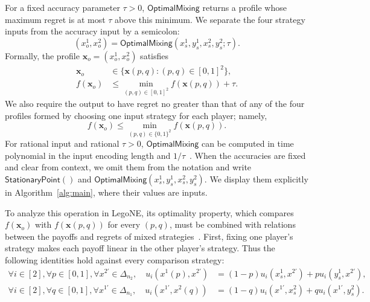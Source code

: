 \documentclass[11pt]{article}
\theoremstyle{remark}
\theoremstyle{plain}
\newcommand{\om}{\mathsf{OptimalMixing}}
\newcommand{\spoint}{\mathsf{StationaryPoint}}
\begin{document}
For a fixed accuracy parameter $\tau>0$, $\om$ returns a profile whose
maximum regret is at most $\tau$ above this minimum. We separate the
four strategy inputs from the accuracy input by a semicolon:
\[
 (x_o^1,x_o^2)=\om(x_s^1,y_s^1,x_s^2,y_s^2;\tau).
\]
Formally, the profile $\boldsymbol{x}_o=(x_o^1,x_o^2)$ satisfies
\begin{equation}
 \begin{aligned}
  \boldsymbol{x}_o&\in
      \{\boldsymbol{x}(p,q):(p,q)\in[0,1]^2\},\\
  f(\boldsymbol{x}_o)&\le
       \min_{(p,q)\in[0,1]^2}f(\boldsymbol{x}(p,q))+\tau.
 \end{aligned}
 \label{eq:om-definition}
\end{equation}
We also require the output to have regret no greater than that of any
of the four profiles formed by choosing one input strategy for each
player; namely,
\[
 f(\boldsymbol{x}_o)\le
       \min_{(p,q)\in\{0,1\}^2}f(\boldsymbol{x}(p,q)).
\]
For rational input
and rational $\tau>0$, $\om$ can be computed in time polynomial
in the input encoding length and $1/\tau$~\cite{mixing2025}.
When the accuracies are fixed and clear from context, we omit them
from the notation and write $\spoint()$ and
$\om(x_s^1,y_s^1,x_s^2,y_s^2)$. We display them explicitly in
Algorithm~\ref{alg:main}, where their values are inputs.

To analyze this operation in LegoNE, its optimality property, which
compares $f(\boldsymbol x_o)$ with $f(\boldsymbol x(p,q))$ for every
$(p,q)$, must be combined with relations between the payoffs and regrets of mixed
strategies~\cite{legone2026}. First, fixing one player's strategy
makes each payoff linear in the other player's strategy. Thus the
following identities hold against every comparison strategy:
\begin{equation}
 \begin{aligned}
  \forall i\in[2],\forall p\in[0,1],
  \forall x^{2\prime}\in\Delta_{n_2},\quad
  u_i(x^1(p),x^{2\prime})
   &=(1-p)u_i(x_s^1,x^{2\prime})+p u_i(y_s^1,x^{2\prime}),\\[2pt]
  \forall i\in[2],\forall q\in[0,1],
  \forall x^{1\prime}\in\Delta_{n_1},\quad
  u_i(x^{1\prime},x^2(q))
   &=(1-q)u_i(x^{1\prime},x_s^2)+q u_i(x^{1\prime},y_s^2).
 \end{aligned}
 \label{eq:mixing-payoffs}
\end{equation}
\end{document}
